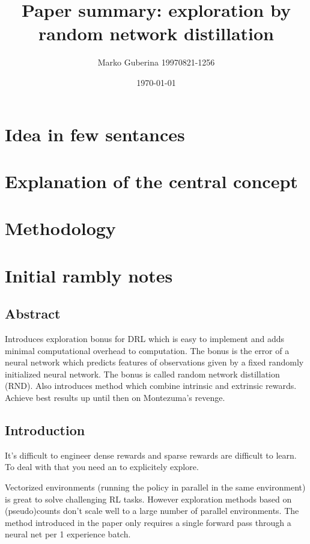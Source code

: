\documentclass{article}
\title{Paper summary: exploration by random network distillation}
\date{\today}
\author{Marko Guberina 19970821-1256}
\begin{document}
\maketitle


\section{Idea in few sentances}




\section{Explanation of the central concept}




\section{Methodology}


\section{Initial rambly notes}

\subsection{Abstract}
Introduces exploration bonus for DRL which is easy to implement and adds minimal computational overhead to computation.
The bonus is the error of a neural network which predicts features of observations given by a fixed randomly initialized neural network.
The bonus is called random network distillation (RND).
Also introduces method which combine intrinsic and extrinsic rewards.
Achieve best results up until then on Montezuma's revenge.

\subsection{Introduction}
It's difficult to engineer dense rewards and sparse rewards are difficult to learn.
To deal with that you need an to explicitely explore.

Vectorized environments (running the policy in parallel in the same environment) is great to solve challenging
RL tasks. However exploration methods based on (pseudo)counts don't scale well to a large number of parallel environments.
The method introduced in the paper only requires a single forward pass through a neural net per 1 experience batch.
\end{document}
